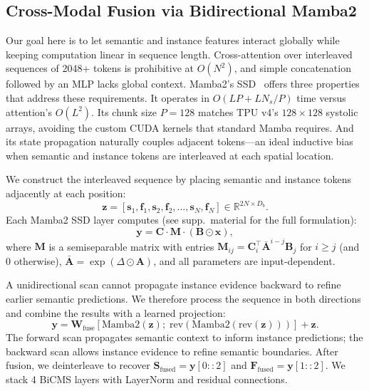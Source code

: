 \documentclass[10pt,twocolumn,letterpaper]{article}
\begin{document}
\subsection{Cross-Modal Fusion via Bidirectional Mamba2}
\label{sec:bicms}

Our goal here is to let semantic and instance features interact globally while keeping computation linear in sequence length. Cross-attention over interleaved sequences of 2048+ tokens is prohibitive at $O(N^2)$, and simple concatenation followed by an MLP lacks global context. Mamba2's SSD~\cite{dao2024mamba2} offers three properties that address these requirements. It operates in $O(LP + LN_s/P)$ time versus attention's $O(L^2)$. Its chunk size $P{=}128$ matches TPU v4's $128 {\times} 128$ systolic arrays, avoiding the custom CUDA kernels that standard Mamba requires. And its state propagation naturally couples adjacent tokens---an ideal inductive bias when semantic and instance tokens are interleaved at each spatial location.

We construct the interleaved sequence by placing semantic and instance tokens adjacently at each position:
\begin{equation}
\mathbf{z} = [\mathbf{s}_1, \mathbf{f}_1, \mathbf{s}_2, \mathbf{f}_2, \ldots, \mathbf{s}_N, \mathbf{f}_N] \in \mathbb{R}^{2N \times D_b}.
\label{eq:interleave}
\end{equation}
Each Mamba2 SSD layer computes (see supp.\ material for the full formulation):
\begin{equation}
\mathbf{y} = \mathbf{C} \!\cdot\! \mathbf{M} \!\cdot\! (\mathbf{B} \odot \mathbf{x}),
\label{eq:mamba2_ssd}
\end{equation}
where $\mathbf{M}$ is a semiseparable matrix with entries $\mathbf{M}_{ij} = \mathbf{C}_i^\top \bar{\mathbf{A}}^{i-j} \mathbf{B}_j$ for $i {\geq} j$ (and 0 otherwise), $\bar{\mathbf{A}} = \exp(\Delta \odot \mathbf{A})$, and all parameters are input-dependent.

A unidirectional scan cannot propagate instance evidence backward to refine earlier semantic predictions. We therefore process the sequence in both directions and combine the results with a learned projection:
\begin{equation}
\mathbf{y} = \mathbf{W}_{\text{fuse}}[\text{Mamba2}(\mathbf{z});\; \text{rev}(\text{Mamba2}(\text{rev}(\mathbf{z})))] + \mathbf{z}.
\label{eq:fusion}
\end{equation}
The forward scan propagates semantic context to inform instance predictions; the backward scan allows instance evidence to refine semantic boundaries. After fusion, we deinterleave to recover $\mathbf{S}_{\text{fused}} = \mathbf{y}[0{:}{:}2]$ and $\mathbf{F}_{\text{fused}} = \mathbf{y}[1{:}{:}2]$. We stack 4 BiCMS layers with LayerNorm and residual connections.
\end{document}
